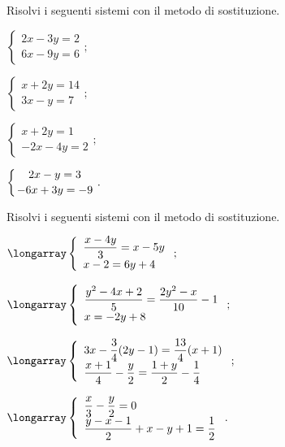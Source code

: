 \begin{esercizio}[\Ast]
 \label{ese:22.10}
Risolvi i seguenti sistemi con il metodo di sostituzione.
 \begin{multicols}{2}
 \begin{enumeratea}
  \item $\left\{\begin{array}{l}2x-3y=2\\6x-9y=6\end{array}\right.;$
\item $\left\{\begin{array}{l}x+2y=14\\3x-y=7\end{array}\right.;$
\item $\left\{\begin{array}{l}x+2y=1\\-2x-4y=2\end{array}\right.;$
\item $\left\{\genfrac{}{}{0pt}{0}{2x-y=3}{-6x+3y=-9}\right..$
 \end{enumeratea}
 \end{multicols}
\end{esercizio}

\begin{esercizio}[\Ast]
 \label{ese:22.11}
Risolvi i seguenti sistemi con il metodo di sostituzione.
 \begin{multicols}{2}
 \begin{enumeratea}
 \item $\longarray\left\{\begin{array}{l}\dfrac{x-4y}{3}=x-5y\\x-2=6y+4 \end{array}\right.;$
\item $\longarray\left\{\begin{array}{l}\dfrac{y^{2}-4x+2}{5}=\dfrac{2y^{2}-x}{10}-1\\x=-2y+8\end{array}\right.;$
\item $\longarray\left\{\begin{array}{l}3x-\dfrac{3}{4}(2y-1)=\dfrac{13}{4}(x+1)\\\dfrac{x+1}{4}-\dfrac{y}{2}=\dfrac{1+y}{2}-\dfrac{1}{4}\end{array}\right.;$
\item $\longarray\left\{\begin{array}{l}\dfrac{x}{3}-\dfrac{y}{2}=0\\\dfrac{y-x-1}{2}+x-y+1=\dfrac{1}{2}\end{array}\right..$
 \end{enumeratea}
 \end{multicols}
\end{esercizio}

